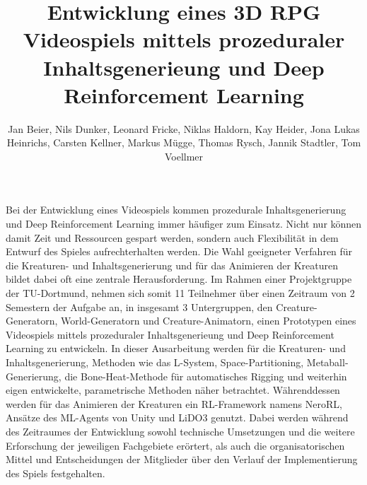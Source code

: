 \documentclass[german,pg]{tudo-sse-thesis}
\title{Entwicklung eines 3D RPG Videospiels mittels prozeduraler Inhaltsgenerieung und Deep Reinforcement Learning}
\author{Jan Beier, Nils Dunker, Leonard Fricke, Niklas Haldorn, Kay Heider, \linebreak Jona Lukas Heinrichs, Carsten Kellner, Markus Mügge, Thomas Rysch, Jannik Stadtler, Tom Voellmer}
\begin{document}
\maketitle
{}

\begin{abstract-ger}
	Bei der Entwicklung eines Videospiels kommen prozedurale Inhaltsgenerierung und Deep Reinforcement Learning immer häufiger zum Einsatz. Nicht nur können damit Zeit und Ressourcen gespart werden, sondern auch Flexibilität in dem Entwurf des Spieles aufrechterhalten werden. Die Wahl geeigneter Verfahren für die Kreaturen- und Inhaltsgenerierung und für das Animieren der Kreaturen bildet dabei oft eine zentrale Herausforderung. Im Rahmen einer Projektgruppe der TU-Dortmund, nehmen sich somit 11 Teilnehmer über einen Zeitraum von 2 Semestern der Aufgabe an, in insgesamt 3 Untergruppen, den Creature-Generatorn, World-Generatorn und Creature-Animatorn, einen Prototypen eines Videospiels mittels prozeduraler Inhaltsgenerieung und Deep Reinforcement Learning zu entwickeln. In dieser Ausarbeitung werden für die Kreaturen- und Inhaltsgenerierung, Methoden wie das L-System, Space-Partitioning, Metaball-Generierung, die Bone-Heat-Methode für automatisches Rigging und weiterhin eigen entwickelte, parametrische Methoden näher betrachtet. Währenddessen werden für das Animieren der Kreaturen ein RL-Framework namens NeroRL, Ansätze des ML-Agents von Unity und LiDO3 genutzt. Dabei werden während des Zeitraumes der Entwicklung sowohl technische Umsetzungen und die weitere Erforschung der jeweiligen Fachgebiete erörtert, als auch die organisatorischen Mittel und Entscheidungen der Mitglieder über den Verlauf der Implementierung des Spiels festgehalten. 
\end{abstract-ger}

\tableofcontents
\cleardoublepage

















\cleardoublepage

{}
\listoffigures				%
\cleardoublepage

{}
\listoftables				%
\cleardoublepage

{}
\listofalgorithms
\cleardoublepage

\printbibliography
\end{document}
